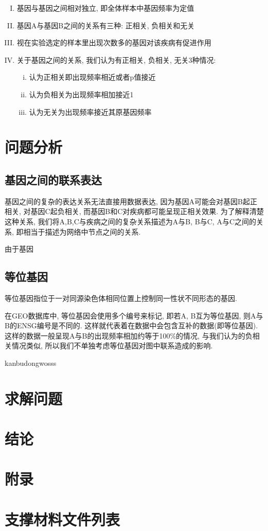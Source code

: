 \documentclass[zihao=-4]{ctexart}
\begin{document}
\begin{enumerate}[I.]
    \item 基因与基因之间相对独立, 即全体样本中基因频率为定值
    \item 基因A与基因B之间的关系有三种: 正相关, 负相关和无关
    \item 视在实验选定的样本里出现次数多的基因对该疾病有促进作用
    \item 关于基因之间的关系, 我们认为有正相关, 负相关, 无关3种情况:
    \begin{enumerate}[i.]
        \item 认为正相关即出现频率相近或者p值接近
        \item 认为负相关为出现频率相加接近1
        \item 认为无关为出现频率接近其原基因频率
    \end{enumerate}
\end{enumerate}



\section{问题分析}
\subsection{基因之间的联系表达}
基因之间的复杂的表达关系无法直接用数据表达, 因为基因A可能会对基因B起正相关, 对基因C起负相关, 而基因B和C对疾病都可能呈现正相关效果. 为了解释清楚这种关系, 我们将A,B,C与疾病之间的复杂关系描述为A与B, B与C, A与C之间的关系, 即相当于描述为网络中节点之间的关系.

由于基因

\subsection{等位基因}
等位基因指位于一对同源染色体相同位置上控制同一性状不同形态的基因.

在GEO数据库中, 等位基因会使用多个编号来标记, 即若A, B互为等位基因, 则A与B的ENSG编号是不同的. 这样就代表着在数据中会包含互补的数据(即等位基因). 这样的数据一般呈现A与B的出现频率相加约等于100\%的情况, 与我们认为的负相关情况类似, 所以我们不单独考虑等位基因对图中联系造成的影响.



kanbudong\cite{ranger}wosss
\section{求解问题}

\newpage
\section*{结论}


\newpage
\section*{附录}



\section*{支撑材料文件列表}
\end{document}
